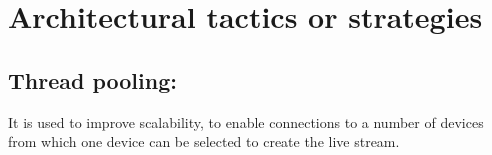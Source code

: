\section{Architectural tactics or strategies}
	\subsection{Thread pooling: }It is used to improve scalability, to enable connections to a number of devices from which one device can be selected to create the live stream.
